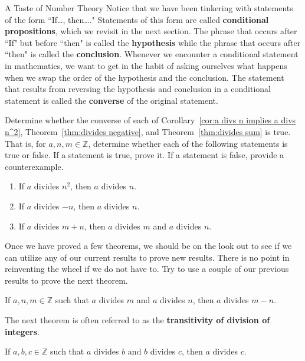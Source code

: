 \begin{section}{A Taste of Number Theory}
Notice that we have been tinkering with statements of the form ``If\ldots, then\ldots." Statements of this form are called \textbf{conditional propositions}, which we revisit in the next section.  The phrase that occurs after ``If" but before ``then" is called the \textbf{hypothesis} while the phrase that occurs after ``then" is called the \textbf{conclusion}.  Whenever we encounter a conditional statement in mathematics, we want to get in the habit of asking ourselves what happens when we swap the order of the hypothesis and the conclusion.  The statement that results from reversing the hypothesis and conclusion in a conditional statement is called the \textbf{converse} of the original statement.  %

\begin{problem}
Determine whether the converse of each of Corollary~\ref{cor:a divs n implies a divs n^2}, Theorem~\ref{thm:divides negative}, and Theorem~\ref{thm:divides sum} is true.  That is, for $a,n,m\in\mathbb{Z}$, determine whether each of the following statements is true or false. If a statement is true, prove it. If a statement is false, provide a counterexample.
\begin{enumerate}[label=\textrm{(\alph*)}]
\item If $a$ divides $n^2$, then $a$ divides $n$.
\item If $a$ divides $-n$, then $a$ divides $n$.
\item If $a$ divides $m+n$, then $a$ divides $m$ and $a$ divides $n$.
\end{enumerate}
\end{problem}

Once we have proved a few theorems, we should be on the look out to see if we can utilize any of our current results to prove new results.  There is no point in reinventing the wheel if we do not have to.  Try to use a couple of our previous results to prove the next theorem.

\begin{theorem}
If $a,n,m\in\mathbb{Z}$ such that $a$ divides $m$ and $a$ divides $n$, then $a$ divides $m-n$.
\end{theorem}

The next theorem is often referred to as the \textbf{transitivity of division of integers}.

\begin{theorem}
If $a,b,c\in\mathbb{Z}$ such that $a$ divides $b$ and $b$ divides $c$, then $a$ divides $c$.
\end{theorem}

\end{section}